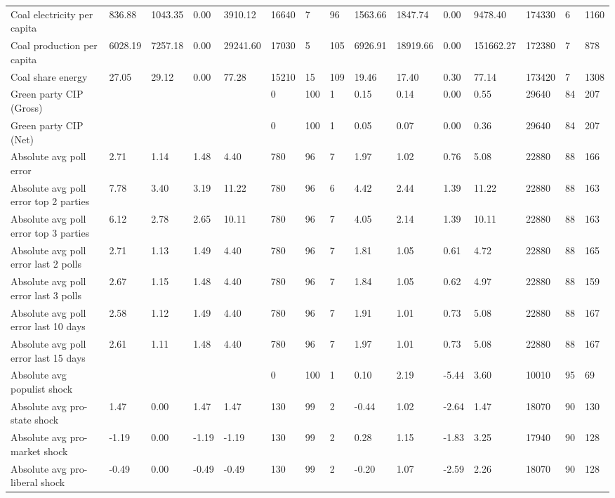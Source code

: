 \begin{longtable}{lllllllllllllll}
Coal electricity per capita & 836.88 & 1043.35 & 0.00 & 3910.12 & 16640 & 7 & 96 & 1563.66 & 1847.74 & 0.00 & 9478.40 & 174330 & 6 & 1160\\
Coal production per capita & 6028.19 & 7257.18 & 0.00 & 29241.60 & 17030 & 5 & 105 & 6926.91 & 18919.66 & 0.00 & 151662.27 & 172380 & 7 & 878\\
Coal share energy & 27.05 & 29.12 & 0.00 & 77.28 & 15210 & 15 & 109 & 19.46 & 17.40 & 0.30 & 77.14 & 173420 & 7 & 1308\\
\addlinespace
Green party CIP (Gross) &  &  &  &  & 0 & 100 & 1 & 0.15 & 0.14 & 0.00 & 0.55 & 29640 & 84 & 207\\
Green party CIP (Net) &  &  &  &  & 0 & 100 & 1 & 0.05 & 0.07 & 0.00 & 0.36 & 29640 & 84 & 207\\
Absolute avg poll error & 2.71 & 1.14 & 1.48 & 4.40 & 780 & 96 & 7 & 1.97 & 1.02 & 0.76 & 5.08 & 22880 & 88 & 166\\
Absolute avg poll error top 2 parties & 7.78 & 3.40 & 3.19 & 11.22 & 780 & 96 & 6 & 4.42 & 2.44 & 1.39 & 11.22 & 22880 & 88 & 163\\
Absolute avg poll error top 3 parties & 6.12 & 2.78 & 2.65 & 10.11 & 780 & 96 & 7 & 4.05 & 2.14 & 1.39 & 10.11 & 22880 & 88 & 163\\
\addlinespace
Absolute avg poll error last 2 polls & 2.71 & 1.13 & 1.49 & 4.40 & 780 & 96 & 7 & 1.81 & 1.05 & 0.61 & 4.72 & 22880 & 88 & 165\\
Absolute avg poll error last 3 polls & 2.67 & 1.15 & 1.48 & 4.40 & 780 & 96 & 7 & 1.84 & 1.05 & 0.62 & 4.97 & 22880 & 88 & 159\\
Absolute avg poll error last 10 days & 2.58 & 1.12 & 1.49 & 4.40 & 780 & 96 & 7 & 1.91 & 1.01 & 0.73 & 5.08 & 22880 & 88 & 167\\
Absolute avg poll error last 15 days & 2.61 & 1.11 & 1.48 & 4.40 & 780 & 96 & 7 & 1.97 & 1.01 & 0.73 & 5.08 & 22880 & 88 & 167\\
Absolute avg populist shock &  &  &  &  & 0 & 100 & 1 & 0.10 & 2.19 & -5.44 & 3.60 & 10010 & 95 & 69\\
\addlinespace
Absolute avg pro-state shock & 1.47 & 0.00 & 1.47 & 1.47 & 130 & 99 & 2 & -0.44 & 1.02 & -2.64 & 1.47 & 18070 & 90 & 130\\
Absolute avg pro-market shock & -1.19 & 0.00 & -1.19 & -1.19 & 130 & 99 & 2 & 0.28 & 1.15 & -1.83 & 3.25 & 17940 & 90 & 128\\
Absolute avg pro-liberal shock & -0.49 & 0.00 & -0.49 & -0.49 & 130 & 99 & 2 & -0.20 & 1.07 & -2.59 & 2.26 & 18070 & 90 & 128\\

\end{longtable}
